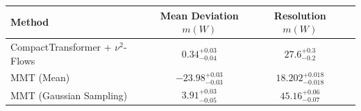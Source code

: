     \begin{tabular}{lccc}
        \toprule
        Method & Mean Deviation $m(W)$ & Resolution $m(W)$ \\
        \midrule
        CompactTransformer + $\nu^2$-Flows & $0.34^{+0.03}_{-0.04}$ & $27.6^{+0.3}_{-0.2}$ \\
        MMT (Mean) & $-23.98^{+0.03}_{-0.03}$ & $18.202^{+0.018}_{-0.018}$ \\
        MMT (Gaussian Sampling) & $3.91^{+0.03}_{-0.05}$ & $45.16^{+0.06}_{-0.07}$ \\
        \bottomrule
    \end{tabular}